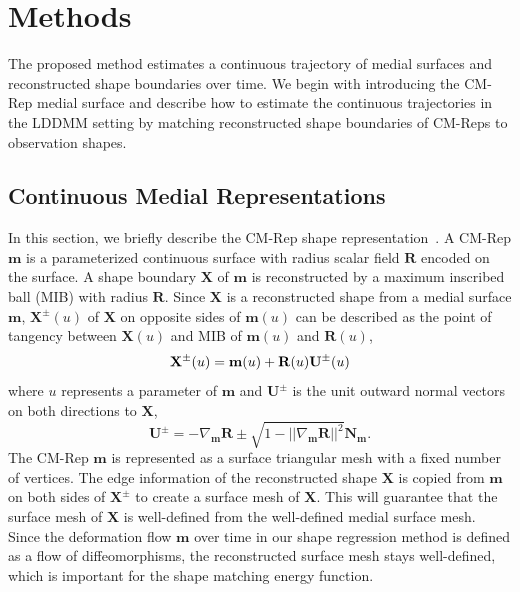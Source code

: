 \documentclass{llncs}
\begin{document}
\section{Methods}

The proposed method estimates a continuous trajectory of medial surfaces and reconstructed shape boundaries over time. 
We begin with introducing the CM-Rep medial surface and describe how to estimate the continuous trajectories in the LDDMM setting by matching reconstructed shape boundaries of CM-Reps to observation shapes. 

\subsection{Continuous Medial Representations}
\label{ssec:CMRep}

In this section, we briefly describe the CM-Rep shape representation~\cite{Yushkevich2009}. 
A CM-Rep $\mathbf{m}$ is a parameterized continuous surface with radius scalar field $\mathbf{R}$ encoded on the surface. 
A shape boundary $\mathbf{X}$ of $\mathbf{m}$ is reconstructed by a maximum inscribed ball (MIB) with radius $\mathbf{R}$. 
Since $\mathbf{X}$ is a reconstructed shape from a medial surface $\mathbf{m}$, $\mathbf{X}^{\pm}(u)$ of $\mathbf{X}$ on opposite sides of $\mathbf{m}(u)$ 
can be described as the point of tangency between $\mathbf{X}(u)$ and MIB of $\mathbf{m}(u)$ and $\mathbf{R}(u)$, 
\begin{equation}
 \mathbf{X}^{\pm}(u) = \mathbf{m}(u) + \mathbf{R}(u)\mathbf{U}^{\pm}(u) \\
\end{equation}
where $u$ represents a parameter of $\mathbf{m}$ and $\mathbf{U}^{\pm}$ is the unit outward normal vectors on both directions to $\mathbf{X}$,
\begin{equation}
 \mathbf{U}^{\pm} = -\nabla_\mathbf{m} \mathbf{R} \pm \sqrt{ 1 - || \nabla_\mathbf{m} \mathbf{R} ||^2 }\mathbf{N}_\mathbf{m}.
\end{equation}
The CM-Rep $\mathbf{m}$ is represented as a surface triangular mesh with a fixed number of vertices. 
The edge information of the reconstructed shape $\mathbf{X}$ is copied from $\mathbf{m}$ on both sides of $\mathbf{X}^\pm$ to create a surface mesh of $\mathbf{X}$. 
This will guarantee that the surface mesh of $\mathbf{X}$ is well-defined from the well-defined medial surface mesh. 
Since the deformation flow $\mathbf{m}$ over time in our shape regression method is defined as a flow of diffeomorphisms, the reconstructed surface mesh stays well-defined, which is important for the shape matching energy function. 
\end{document}
